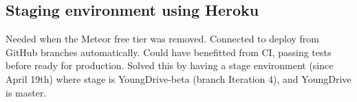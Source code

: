 \subsection{Staging environment using Heroku}
Needed when the Meteor free tier was removed. Connected to deploy from GitHub branches automatically. Could have benefitted from CI, passing tests before ready for production. Solved this by having a stage environment (since April 19th) where stage is YoungDrive-beta (branch Iteration 4), and YoungDrive is master.

